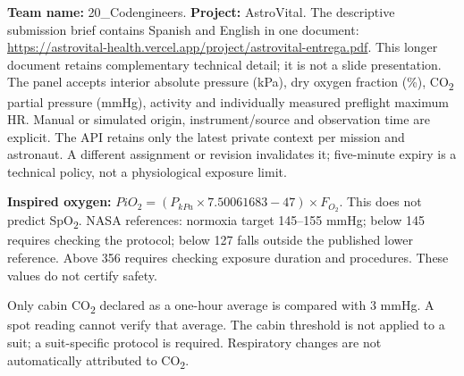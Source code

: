 \newpage
{}
\textbf{Team name:} 20\_Codengineers. \textbf{Project:} AstroVital.
The descriptive submission brief contains Spanish and English in one document: \url{https://astrovital-health.vercel.app/project/astrovital-entrega.pdf}. This longer document retains complementary technical detail; it is not a slide presentation.
The panel accepts interior absolute pressure (kPa), dry oxygen fraction (\%), CO\textsubscript{2} partial pressure (mmHg), activity and individually measured preflight maximum HR. Manual or simulated origin, instrument/source and observation time are explicit. The API retains only the latest private context per mission and astronaut. A different assignment or revision invalidates it; five-minute expiry is a technical policy, not a physiological exposure limit.
\begin{infobox}
\textbf{Inspired oxygen:} $PiO_2=(P_{kPa}\times7.50061683-47)\times F_{O_2}$. This does not predict SpO\textsubscript{2}. NASA references: normoxia target 145--155 mmHg; below 145 requires checking the protocol; below 127 falls outside the published lower reference. Above 356 requires checking exposure duration and procedures. These values do not certify safety.
\end{infobox}
Only cabin CO\textsubscript{2} declared as a one-hour average is compared with 3 mmHg. A spot reading cannot verify that average. The cabin threshold is not applied to a suit; a suit-specific protocol is required. Respiratory changes are not automatically attributed to CO\textsubscript{2}.

